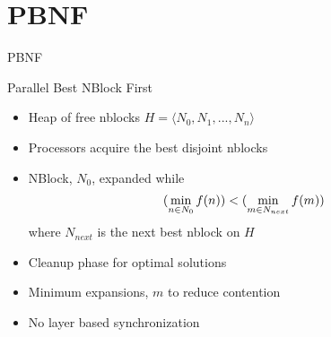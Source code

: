 \documentclass[style=unh]{powerdot}
\begin{document}

\section{PBNF}


\begin{slide}{PBNF}
  \vspace{.2in}
  \begin{center}
    Parallel Best NBlock First
  \end{center}

  \begin{itemize}
  \item Heap of free nblocks $H = \langle N_0, N_1, ..., N_n \rangle$
  \item Processors acquire the best disjoint nblocks
  \item NBlock, $N_0$, expanded while
    \begin{eqnarray*}
      (\mathop{\rm min}_{n \in N_0} f(n)) < (\mathop{\rm min}_{m \in N_{next}} f(m))
    \end{eqnarray*}
    where $N_{next}$ is the next best nblock on $H$
  \item Cleanup phase for optimal solutions
  \item Minimum expansions, $m$ to reduce contention
  \item No layer based synchronization
  \end{itemize}

\end{slide}

\end{document}
